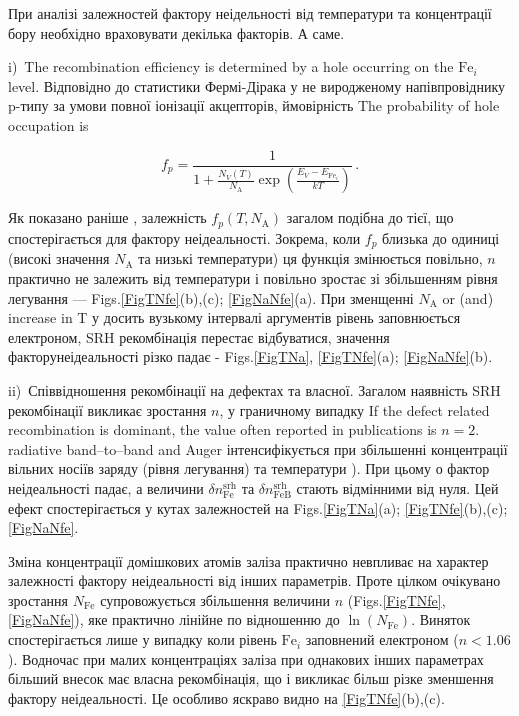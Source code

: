 \documentclass[12pt]{article}
\begin{document}
При аналізі залежностей фактору неідельності від температури та концентрації бору необхідно враховувати декілька факторів. А саме.

i)~The recombination efficiency is determined by a hole occurring on the $\mathrm{Fe}_i$ level.
Відповідно до статистики Фермі-Дірака у не виродженому напівпровіднику p-типу за умови повної іонізації акцепторів, ймовірність
The probability of hole occupation is

\begin{equation}
\label{eqfp}
 f_p=\frac{1}{1+\frac{N_V(T)}{N_\mathrm{A}}\exp\left(\frac{E_V-E_{\mathrm{Fe}_i}}{kT}\right)}\,.
\end{equation}

Як показано раніше  \cite{Olikh2018SM}, залежність $f_p(T,N_\mathrm{A})$ загалом подібна до тієї, що спостерігається для фактору неідеальності.
Зокрема, коли  $f_p$ близька до одиниці (високі значення $N_\mathrm{A}$ та низькі температури) ця функція змінюється повільно, $n$ практично не залежить від температури і повільно зростає зі збільшенням рівня легування --- Figs.\ref{FigTNfe}(b),(c); \ref{FigNaNfe}(a).
При зменщенні $N_\mathrm{A}$ or (and) increase in T у досить вузькому інтервалі аргументів рівень заповнюється електроном, SRH рекомбінація перестає відбуватися, значення факторунеідеальності  різко падає - Figs.\ref{FigTNa}, \ref{FigTNfe}(a); \ref{FigNaNfe}(b).

ii)~Співвідношення рекомбінації на дефектах та власної.
Загалом наявність SRH рекомбінації викликає зростання $n$, у граничному випадку 
If the defect related recombination is dominant, the value often reported in publications is $n=2$.
radiative band--to--band and Auger інтенсифікується при збільшенні концентрації вільних носіїв заряду (рівня легування) та температури \cite{Si_BtB,Si_Auger}).
При цьому 
о фактор неідеальності падає, а величини 
$\delta n_\mathrm{Fe}^\mathrm{srh}$ 
та 
$\delta n_\mathrm{FeB}^\mathrm{srh}$
стають відмінними від нуля.
Цей ефект спостерігається у кутах залежностей на  Figs.\ref{FigTNa}(a); \ref{FigTNfe}(b),(c); \ref{FigNaNfe}.

Зміна концентрації домішкових атомів заліза практично невпливає на характер залежності фактору неідеальності від інших параметрів.
Проте цілком очікувано зростання $N_\mathrm{Fe}$  супровожується збільшення величини $n$ 
(Figs.\ref{FigTNfe}, \ref{FigNaNfe}), яке практично лінійне по відношенню до $\ln(N_\mathrm{Fe})$.
Виняток спостерігається лише у випадку коли рівень $\mathrm{Fe}_i$ заповнений електроном ($n<1.06$).
Водночас при малих концентраціях заліза при однакових інших параметрах більший внесок має власна рекомбінація, що і викликає більш різке зменшення фактору неідеальності.
Це особливо яскраво видно на \ref{FigTNfe}(b),(c). 
\end{document}
